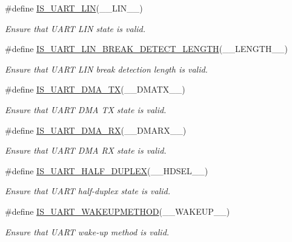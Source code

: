 \begin{DoxyCompactItemize}
\#define \mbox{\hyperlink{group___u_a_r_t___private___macros_ga13d7f9876db68d9d6316204a8a2588de}{I\+S\+\_\+\+U\+A\+R\+T\+\_\+\+L\+IN}}(\+\_\+\+\_\+\+L\+I\+N\+\_\+\+\_\+)
\begin{DoxyCompactList}\small\item\em Ensure that U\+A\+RT L\+IN state is valid. \end{DoxyCompactList}\item 
\#define \mbox{\hyperlink{group___u_a_r_t___private___macros_gac8ac0d0dc7fad5edf53150ce05d902ee}{I\+S\+\_\+\+U\+A\+R\+T\+\_\+\+L\+I\+N\+\_\+\+B\+R\+E\+A\+K\+\_\+\+D\+E\+T\+E\+C\+T\+\_\+\+L\+E\+N\+G\+TH}}(\+\_\+\+\_\+\+L\+E\+N\+G\+T\+H\+\_\+\+\_\+)
\begin{DoxyCompactList}\small\item\em Ensure that U\+A\+RT L\+IN break detection length is valid. \end{DoxyCompactList}\item 
\#define \mbox{\hyperlink{group___u_a_r_t___private___macros_ga433107c59f6d1c66a38e53e38fdc0a57}{I\+S\+\_\+\+U\+A\+R\+T\+\_\+\+D\+M\+A\+\_\+\+TX}}(\+\_\+\+\_\+\+D\+M\+A\+T\+X\+\_\+\+\_\+)
\begin{DoxyCompactList}\small\item\em Ensure that U\+A\+RT D\+MA TX state is valid. \end{DoxyCompactList}\item 
\#define \mbox{\hyperlink{group___u_a_r_t___private___macros_ga85c4c9339de2076106942cd9ab61ad77}{I\+S\+\_\+\+U\+A\+R\+T\+\_\+\+D\+M\+A\+\_\+\+RX}}(\+\_\+\+\_\+\+D\+M\+A\+R\+X\+\_\+\+\_\+)
\begin{DoxyCompactList}\small\item\em Ensure that U\+A\+RT D\+MA RX state is valid. \end{DoxyCompactList}\item 
\#define \mbox{\hyperlink{group___u_a_r_t___private___macros_ga2298a324be00d275d98b336569ee3f97}{I\+S\+\_\+\+U\+A\+R\+T\+\_\+\+H\+A\+L\+F\+\_\+\+D\+U\+P\+L\+EX}}(\+\_\+\+\_\+\+H\+D\+S\+E\+L\+\_\+\+\_\+)
\begin{DoxyCompactList}\small\item\em Ensure that U\+A\+RT half-\/duplex state is valid. \end{DoxyCompactList}\item 
\#define \mbox{\hyperlink{group___u_a_r_t___private___macros_ga144aecf3ad6ca3ce6653ae113c9a6141}{I\+S\+\_\+\+U\+A\+R\+T\+\_\+\+W\+A\+K\+E\+U\+P\+M\+E\+T\+H\+OD}}(\+\_\+\+\_\+\+W\+A\+K\+E\+U\+P\+\_\+\+\_\+)
\begin{DoxyCompactList}\small\item\em Ensure that U\+A\+RT wake-\/up method is valid. \end{DoxyCompactList}\item 

\end{DoxyCompactItemize}
